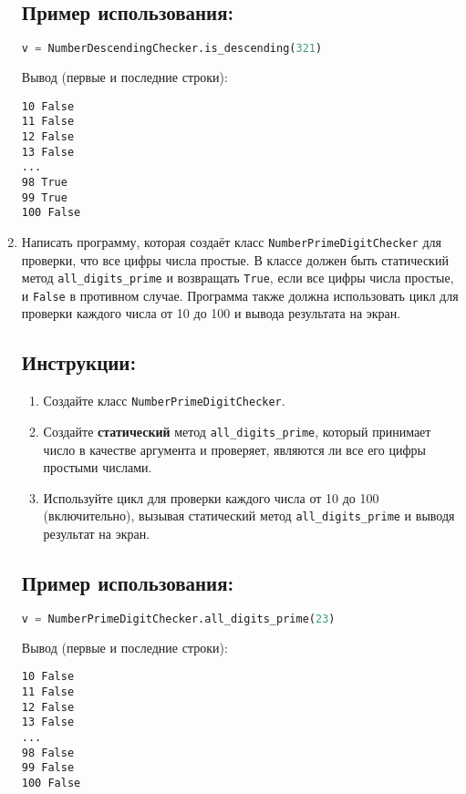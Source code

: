\begin{enumerate}
\subsection*{Пример использования:}
\begin{lstlisting}[language=Python]
    v = NumberDescendingChecker.is_descending(321)
\end{lstlisting}
Вывод (первые и последние строки):
\begin{verbatim}
10 False
11 False
12 False
13 False
...
98 True
99 True
100 False
\end{verbatim}

\item
Написать программу, которая создаёт класс \texttt{NumberPrimeDigitChecker} 
для проверки, что все цифры числа простые. В классе должен быть статический метод
\texttt{all\_digits\_prime} и возвращать \texttt{True}, если все цифры числа простые, 
и \texttt{False} в противном случае. 
Программа также должна использовать цикл для проверки каждого числа от 
10 до 100 и вывода результата на экран.

\subsection*{Инструкции:}
\begin{enumerate}
    \item Создайте класс \texttt{NumberPrimeDigitChecker}.
    \item Создайте \textbf{статический} метод \texttt{all\_digits\_prime}, который принимает число в качестве аргумента и проверяет, являются ли все его цифры простыми числами.
    \item Используйте цикл для проверки каждого числа от 10 до 100 (включительно), вызывая статический метод \texttt{all\_digits\_prime} и выводя результат на экран.
\end{enumerate}

\subsection*{Пример использования:}
\begin{lstlisting}[language=Python]
    v = NumberPrimeDigitChecker.all_digits_prime(23)
\end{lstlisting}
Вывод (первые и последние строки):
\begin{verbatim}
10 False
11 False
12 False
13 False
...
98 False
99 False
100 False
\end{verbatim}


\end{enumerate}
